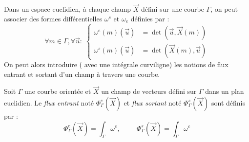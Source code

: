 Dans un espace euclidien, à chaque champ $\overrightarrow X$ défini sur une courbe $\Gamma$, on peut associer des formes différentielles $\omega^s$ et $\omega_e$ définies par :
\begin{displaymath}
 \forall m\in \Gamma,  \forall \overrightarrow u :\;
\left\lbrace 
\begin{aligned}
 \omega^e(m)(\overrightarrow u ) &= \det(\overrightarrow u,\overrightarrow X (m))\\
 \omega^s(m)(\overrightarrow u ) &= \det(\overrightarrow X (m),\overrightarrow u)
\end{aligned}
\right. 
\end{displaymath}
 On peut alors introduire ( avec une intégrale curviligne) les notions de flux entrant et sortant d'un champ à travers une courbe.
\begin{defi}
 Soit $\Gamma$ une courbe orientée et $\overrightarrow X$ un champ de vecteurs défini sur $\Gamma$ dans un plan euclidien. Le \emph{flux entrant} noté $\Phi^e_\Gamma (\overrightarrow X)$ et \emph{flux sortant} noté $\Phi^s_\Gamma (\overrightarrow X)$ sont définis par :
\begin{displaymath}
 \Phi^e_\Gamma (\overrightarrow X)=\int_\Gamma \omega^e,\hspace{1cm}
 \Phi^s_\Gamma (\overrightarrow X)=\int_\Gamma \omega^c
\end{displaymath}
\end{defi}

